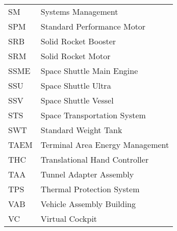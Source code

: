 \documentclass[Space_Shuttle_Vessel_Manual.tex]{subfiles}
\begin{document}
\begin{longtable}{l l }
SM & Systems Management\\
SPM & Standard Performance Motor\\
SRB & Solid Rocket Booster\\
SRM & Solid Rocket Motor\\
SSME & Space Shuttle Main Engine\\
SSU & Space Shuttle Ultra\\
SSV & Space Shuttle Vessel\\
STS & Space Transportation System\\
SWT & Standard Weight Tank\\
TAEM & Terminal Area Energy Management\\
THC & Translational Hand Controller\\
TAA & Tunnel Adapter Assembly\\
TPS & Thermal Protection System\\
VAB & Vehicle Assembly Building\\
VC & Virtual Cockpit\\
\end{longtable}
\end{document}
